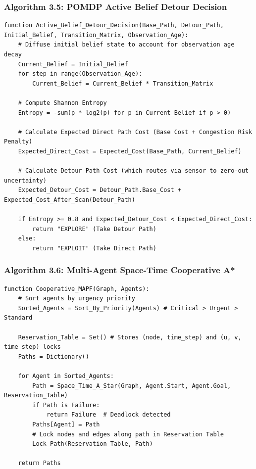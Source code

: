 \documentclass[12pt,a4paper]{report}
\begin{document}
\subsubsection*{Algorithm 3.5: POMDP Active Belief Detour Decision}

\begin{verbatim}
function Active_Belief_Detour_Decision(Base_Path, Detour_Path, Initial_Belief, Transition_Matrix, Observation_Age):
    # Diffuse initial belief state to account for observation age decay
    Current_Belief = Initial_Belief
    for step in range(Observation_Age):
        Current_Belief = Current_Belief * Transition_Matrix
        
    # Compute Shannon Entropy
    Entropy = -sum(p * log2(p) for p in Current_Belief if p > 0)
    
    # Calculate Expected Direct Path Cost (Base Cost + Congestion Risk Penalty)
    Expected_Direct_Cost = Expected_Cost(Base_Path, Current_Belief)
    
    # Calculate Detour Path Cost (which routes via sensor to zero-out uncertainty)
    Expected_Detour_Cost = Detour_Path.Base_Cost + Expected_Cost_After_Scan(Detour_Path)
    
    if Entropy >= 0.8 and Expected_Detour_Cost < Expected_Direct_Cost:
        return "EXPLORE" (Take Detour Path)
    else:
        return "EXPLOIT" (Take Direct Path)
\end{verbatim}

\subsubsection*{Algorithm 3.6: Multi-Agent Space-Time Cooperative A*}

\begin{verbatim}
function Cooperative_MAPF(Graph, Agents):
    # Sort agents by urgency priority
    Sorted_Agents = Sort_By_Priority(Agents) # Critical > Urgent > Standard
    
    Reservation_Table = Set() # Stores (node, time_step) and (u, v, time_step) locks
    Paths = Dictionary()
    
    for Agent in Sorted_Agents:
        Path = Space_Time_A_Star(Graph, Agent.Start, Agent.Goal, Reservation_Table)
        if Path is Failure:
            return Failure  # Deadlock detected
        Paths[Agent] = Path
        # Lock nodes and edges along path in Reservation Table
        Lock_Path(Reservation_Table, Path)
        
    return Paths
\end{verbatim}
\end{document}
